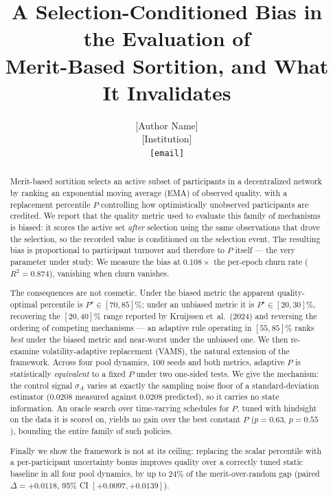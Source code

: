 \documentclass[10pt,twocolumn]{article}
\title{\bfseries A Selection-Conditioned Bias in the Evaluation of\\
Merit-Based Sortition, and What It Invalidates}
\author{%
  [Author Name]\\
  \small [Institution] \\
  \small \texttt{[email]}
}
\date{}
\begin{document}
\maketitle

\begin{abstract}
Merit-based sortition selects an active subset of participants in a decentralized
network by ranking an exponential moving average (EMA) of observed quality, with a
replacement percentile $P$ controlling how optimistically unobserved participants are
credited. We report that the quality metric used to evaluate this family of mechanisms
is biased: it scores the active set \emph{after} selection using the same observations
that drove the selection, so the recorded value is conditioned on the selection event.
The resulting bias is proportional to participant turnover and therefore to $P$ itself
--- the very parameter under study. We measure the bias at $0.108\times$ the per-epoch
churn rate ($R^2=0.874$), vanishing when churn vanishes.

The consequences are not cosmetic. Under the biased metric the apparent
quality-optimal percentile is $P^\star\in[70,85]\%$; under an unbiased metric it is
$P^\star\in[20,30]\%$, recovering the $[20,40]\%$ range reported by
Kruijssen et~al.~(2024) and reversing the ordering of competing mechanisms --- an
adaptive rule operating in $[55,85]\%$ ranks \emph{best} under the biased metric and
near-worst under the unbiased one. We then re-examine volatility-adaptive replacement
(VAMS), the natural extension of the framework. Across four pool dynamics, $100$ seeds
and both metrics, adaptive $P$ is statistically \emph{equivalent} to a fixed $P$ under
two one-sided tests. We give the mechanism: the control signal $\sigma_A$ varies at
exactly the sampling noise floor of a standard-deviation estimator
($0.0208$ measured against $0.0208$ predicted), so it carries no state information.
An oracle search over time-varying schedules for $P$, tuned with hindsight on the
data it is scored on, yields no gain over the best constant $P$ ($p=0.63$, $p=0.55$),
bounding the entire family of such policies.

Finally we show the framework is not at its ceiling: replacing the scalar percentile
with a per-participant uncertainty bonus improves quality over a correctly tuned static
baseline in all four pool dynamics, by up to $24\%$ of the merit-over-random gap
(paired $\Delta=+0.0118$, 95\% CI $[+0.0097,+0.0139]$).
\end{abstract}

\end{document}
